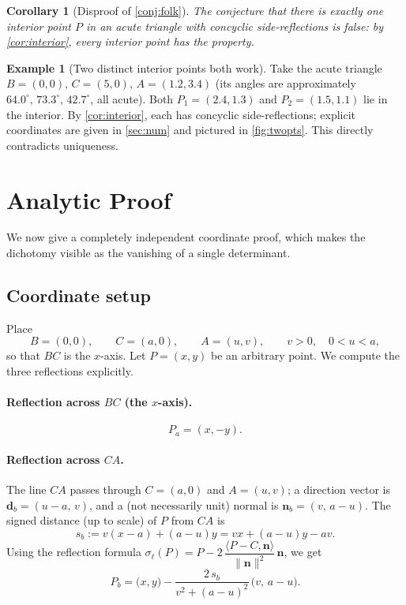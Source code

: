 \documentclass[11pt,a4paper]{article}
\newtheorem{corollary}[theorem]{Corollary}
\theoremstyle{definition}
\newtheorem{example}[theorem]{Example}
\newcommand{\Pa}{P_{a}}
\newcommand{\Pb}{P_{b}}
\newcommand{\vv}[1]{\mathbf{#1}}
\begin{document}
\begin{corollary}[Disproof of \cref{conj:folk}]
The conjecture that there is exactly one interior point $P$ in an acute triangle with concyclic side-reflections is false: by \cref{cor:interior}, every interior point has the property.
\end{corollary}

\begin{example}[Two distinct interior points both work]\label{ex:two}
Take the acute triangle $B=(0,0),\, C=(5,0),\, A=(1.2,3.4)$ (its angles are approximately $64.0^{\circ},\,73.3^{\circ},\,42.7^{\circ}$, all acute). Both $P_{1}=(2.4,1.3)$ and $P_{2}=(1.5,1.1)$ lie in the interior. By \cref{cor:interior}, each has concyclic side-reflections; explicit coordinates are given in \cref{sec:num} and pictured in \cref{fig:twopts}. This directly contradicts uniqueness.
\end{example}

\section{Analytic Proof}\label{sec:analytic}

We now give a completely independent coordinate proof, which makes the dichotomy visible as the vanishing of a single determinant.

\subsection{Coordinate setup}

Place
\begin{equation}\label{eq:coords}
B=(0,0),\qquad C=(a,0),\qquad A=(u,v),\qquad v>0,\quad 0<u<a,
\end{equation}
so that $BC$ is the $x$-axis. Let $P=(x,y)$ be an arbitrary point. We compute the three reflections explicitly.

\paragraph{Reflection across $BC$ (the $x$-axis).}
\begin{equation}\label{eq:Pa-coord}
\Pa=(x,-y).
\end{equation}

\paragraph{Reflection across $CA$.}
The line $CA$ passes through $C=(a,0)$ and $A=(u,v)$; a direction vector is $\vv d_{b}=(u-a,\,v)$, and a (not necessarily unit) normal is $\vv n_{b}=(v,\,a-u)$. The signed distance (up to scale) of $P$ from $CA$ is
\begin{equation}\label{eq:sb}
s_{b}:=v(x-a)+(a-u)y=vx+(a-u)y-av.
\end{equation}
Using the reflection formula $\sigma_{\ell}(P)=P-2\,\dfrac{\langle P-C,\vv n\rangle}{\|\vv n\|^{2}}\,\vv n$, we get
\begin{equation}\label{eq:Pb-coord}
\Pb=\bigl(x,y\bigr)-\frac{2\,s_{b}}{v^{2}+(a-u)^{2}}\,\bigl(v,\,a-u\bigr).
\end{equation}
\end{document}
